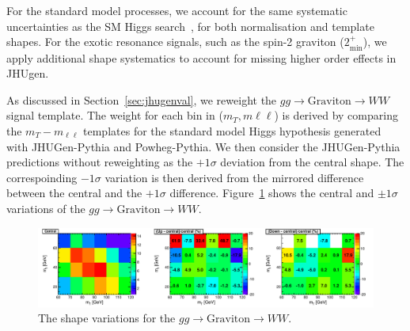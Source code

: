 For the standard model processes, we account for the same systematic
uncertainties as the SM Higgs search~\cite{HWWHCP2012},
for both normalisation and template shapes.
For the exotic resonance signals, such as the spin-2 
graviton ($2_\text{min}^+$), we apply additional 
shape systematics to account for missing higher order effects in JHUgen. 

As discussed in Section~\ref{sec:jhugenval}, we reweight the $gg\to \text{Graviton}\to WW$
signal template.
The weight for each bin in ($m_T, m{\ell\ell}$) is derived by comparing
the $m_T-m_{\ell\ell}$ templates for the standard model Higgs hypothesis
generated with JHUGen-Pythia and Powheg-Pythia.
We then consider the JHUGen-Pythia 
predictions without reweighting as the $+1\sigma$ deviation from the central shape.
The correspoinding $-1\sigma$ variation is then derived from the mirrored difference between 
the central and the $+1\sigma$ difference. 
Figure~\ref{fig:xwwshapevar} shows the central and $\pm1\sigma$ variations 
of the $gg\to \text{Graviton}\to WW$. 

\vspace{20pt}


\begin{figure}[!hbtp]
\centering
\label{subfig:xwwshapevar}
\includegraphics[width=1.05\textwidth]{figures/xww_ggHshapevar.pdf}
\caption{The shape variations for the $gg\to \text{Graviton}\to WW$. 
}
\label{fig:xwwshapevar}
\end{figure}

